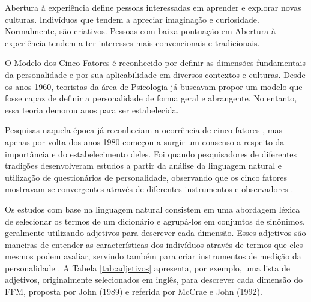 Abertura à experiência define pessoas interessadas em aprender e explorar novas culturas. Indivíduos que tendem a apreciar imaginação e curiosidade. Normalmente, são criativos. Pessoas com baixa pontuação em Abertura à experiência tendem a ter interesses mais convencionais e tradicionais.

O Modelo dos Cinco Fatores é reconhecido por definir as dimensões fundamentais da personalidade e por sua aplicabilidade em diversos contextos e culturas. Desde os anos 1960, teoristas da área de Psicologia já buscavam propor um modelo que fosse capaz de definir a personalidade de forma geral e abrangente. No entanto, essa teoria demorou anos para ser estabelecida.

Pesquisas naquela época já reconheciam a ocorrência de cinco fatores \cite{tupes:61, norman:63}, mas apenas por volta dos anos 1980 começou a surgir um consenso a respeito da importância e do estabelecimento deles. Foi quando pesquisadores de diferentes tradições desenvolveram estudos a partir da análise da linguagem natural e utilização de questionários de personalidade, observando que os cinco fatores mostravam-se convergentes através de diferentes instrumentos e observadores \cite{mccrae:92}.

Os estudos com base na linguagem natural consistem em uma abordagem léxica de selecionar os termos de um dicionário %
e agrupá-los em conjuntos de sinônimos, geralmente utilizando adjetivos para descrever cada dimensão. Esses adjetivos são maneiras de entender as características dos indivíduos através de termos que eles mesmos podem avaliar, servindo também para criar instrumentos de medição da personalidade \cite{goldberg:83, mccrae:85}. A Tabela \ref{tab:adjetivos} apresenta, por exemplo, uma lista de adjetivos, originalmente selecionados em inglês, para descrever cada dimensão do FFM, proposta por John (1989)\nocite{john:89} e referida por McCrae e John (1992)\nocite{mccrae:92}.

